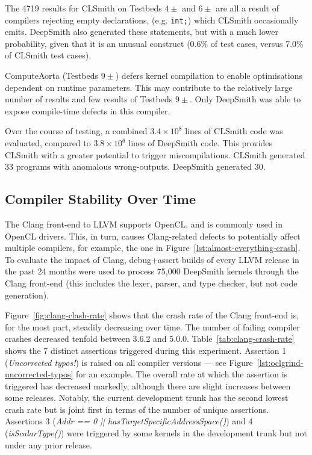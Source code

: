 The 4719 \abf results for CLSmith on Testbeds $4\pm$ and $6\pm$ are all a result of compilers rejecting empty declarations, (e.g. \texttt{int;}) which CLSmith occasionally emits. DeepSmith also generated these statements, but with a much lower probability, given that it is an unusual construct (0.6\% of test cases, versus 7.0\% of CLSmith test cases).

ComputeAorta (Testbeds $9\pm$) defers kernel compilation to enable optimisations dependent on runtime parameters. This may contribute to the relatively large number of \arc results and few \bc results of Testbeds $9\pm$. Only DeepSmith was able to expose compile-time defects in this compiler.

Over the course of testing, a combined $3.4 \times 10^8$ lines of CLSmith code was evaluated, compared to $3.8 \times 10^6$ lines of DeepSmith code. This provides CLSmith with a greater potential to trigger miscompilations. CLSmith generated 33 programs with anomalous wrong-outputs. DeepSmith generated 30.


\subsection{Compiler Stability Over Time}
\label{subsec:clangs}

The Clang front-end to LLVM supports OpenCL, and is commonly used in OpenCL drivers. This, in turn, causes Clang-related defects to potentially affect multiple compilers, for example, the one in Figure~\ref{lst:almost-everything-crash}. To evaluate the impact of Clang, debug+assert builds of every LLVM release in the past 24 months were used to process 75,000 DeepSmith kernels through the Clang front-end (this includes the lexer, parser, and type checker, but not code generation).

Figure~\ref{fig:clang-clash-rate} shows that the crash rate of the Clang front-end is, for the most part, steadily decreasing over time. The number of failing compiler crashes decreased tenfold between 3.6.2 and 5.0.0. Table~\ref{tab:clang-crash-rate} shows the 7 distinct assertions triggered during this experiment. Assertion 1 (\emph{Uncorrected typos!}) is raised on all compiler versions --- see Figure~\ref{lst:oclgrind-uncorrected-typos} for an example. The overall rate at which the assertion is triggered has decreased markedly, although there are slight increases between some releases. Notably, the current development trunk has the second lowest crash rate but is joint first in terms of the number of unique assertions. Assertions 3 (\emph{Addr == 0 || hasTargetSpecificAddressSpace()}) and 4 (\emph{isScalarType()}) were triggered by some kernels in the development trunk but not under any prior release.

